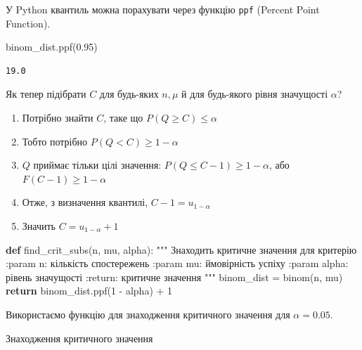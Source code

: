 \documentclass[
  letterpaper,
  10pt,
  openany]{report}
\newenvironment{Shaded}{\begin{snugshade}}{\end{snugshade}}
\newcommand{\CommentTok}[1]{\textcolor[rgb]{0.37,0.37,0.37}{#1}}
\newcommand{\ControlFlowTok}[1]{\textcolor[rgb]{0.00,0.23,0.31}{\textbf{#1}}}
\newcommand{\DecValTok}[1]{\textcolor[rgb]{0.68,0.00,0.00}{#1}}
\newcommand{\FloatTok}[1]{\textcolor[rgb]{0.68,0.00,0.00}{#1}}
\newcommand{\KeywordTok}[1]{\textcolor[rgb]{0.00,0.23,0.31}{\textbf{#1}}}
\newcommand{\NormalTok}[1]{\textcolor[rgb]{0.00,0.23,0.31}{#1}}
\newcommand{\OperatorTok}[1]{\textcolor[rgb]{0.37,0.37,0.37}{#1}}
\providecommand{\tightlist}{%
  \setlength{\itemsep}{0pt}\setlength{\parskip}{0pt}}\usepackage{longtable,booktabs,array}
\theoremstyle{definition}
\theoremstyle{remark}
\newcommand*\circled[1]{\tikz[baseline=(char.base)]{
          \node[shape=circle,draw,inner sep=1pt] (char) {{\scriptsize#1}};}}
\begin{document}
У Python квантиль можна порахувати через функцію \texttt{ppf} (Percent
Point Function).

\label{annotated-cell-12}%
\begin{Shaded}
\begin{Highlighting}[]
\NormalTok{binom\_dist.ppf(}\FloatTok{0.95}\NormalTok{) }\hspace*{\fill}\NormalTok{\circled{1}}
\end{Highlighting}
\end{Shaded}

\begin{verbatim}
19.0
\end{verbatim}

Як тепер підібрати \(C\) для будь-яких \(n, \mu\) й для будь-якого рівня
значущості \(\alpha\)?

\begin{enumerate}
\def\labelenumi{\arabic{enumi}.}
\tightlist
\item
  Потрібно знайти \(C\), таке що \(P(Q \geqslant C) \leqslant \alpha\)
\item
  Тобто потрібно \(P(Q < C) \geqslant 1 - \alpha\)
\item
  \(Q\) приймає тільки цілі значення:
  \(P(Q \leqslant C - 1) \geqslant 1 - \alpha\), або
  \(F(C - 1) \geqslant 1 - \alpha\)
\item
  Отже, з визначення квантилі, \(C - 1 = u_{1 - \alpha}\)
\item
  Значить \(C = u_{1 - \alpha} + 1\)
\end{enumerate}

\begin{Shaded}
\begin{Highlighting}[]
\KeywordTok{def}\NormalTok{ find\_crit\_subs(n, mu, alpha):}
    \CommentTok{"""}
\CommentTok{    Знаходить критичне значення для критерію}
\CommentTok{    :param n: кількість спостережень}
\CommentTok{    :param mu: ймовірність успіху}
\CommentTok{    :param alpha: рівень значущості}
\CommentTok{    :return: критичне значення}
\CommentTok{    """}
\NormalTok{    binom\_dist }\OperatorTok{=}\NormalTok{ binom(n, mu)}
    \ControlFlowTok{return}\NormalTok{ binom\_dist.ppf(}\DecValTok{1} \OperatorTok{{-}}\NormalTok{ alpha) }\OperatorTok{+} \DecValTok{1}
\end{Highlighting}
\end{Shaded}

Використаємо функцію для знаходження критичного значення для
\(\alpha = 0.05\).

\begin{codelisting}

\caption{\label{lst-find-crit-subs}Знаходження критичного значення}

\centering{

\begin{Shaded}
\begin{Highlighting}[]
\NormalTok{find\_crit\_subs(}\DecValTok{30}\NormalTok{, }\FloatTok{0.5}\NormalTok{, }\FloatTok{0.05}\NormalTok{)}
\end{Highlighting}
\end{Shaded}

}

\end{codelisting}%
\end{document}

